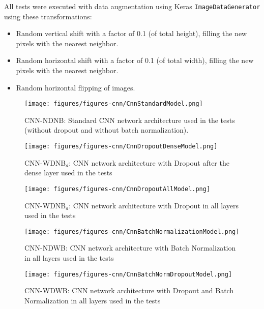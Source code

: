\documentclass[../dropout-vs-batch-normalization.tex]{subfiles}
\begin{document}
All tests were executed with data augmentation using Keras \verb|ImageDataGenerator| using these transformations:

\begin{itemize}
\item Random vertical shift with a factor of 0.1 (of total height), filling the new pixels with the nearest neighbor.
\item Random horizontal shift with a factor of 0.1 (of total width), filling the new pixels with the nearest neighbor.
\item Random horizontal flipping of images.

\end{itemize}

\begin{figure*}
\centerline{\texttt{[image: figures/figures-cnn/CnnStandardModel.png]}}
\caption{CNN-NDNB: Standard CNN network architecture used in the tests (without dropout and without batch normalization).}
\label{fig:CnnStandardModel}
\end{figure*}

\begin{figure*}
\centerline{\texttt{[image: figures/figures-cnn/CnnDropoutDenseModel.png]}}
\caption{CNN-WDNB$_d$: CNN network architecture with Dropout after the dense layer used in the tests}
\label{fig:CnnDropoutDenseModel}
\end{figure*}

\begin{figure*}
\centerline{\texttt{[image: figures/figures-cnn/CnnDropoutAllModel.png]}}
\caption{CNN-WDNB$_a$: CNN network architecture with Dropout in all layers used in the tests}
\label{fig:CnnDropoutAllModel}
\end{figure*}

\begin{figure*}
\centerline{\texttt{[image: figures/figures-cnn/CnnBatchNormalizationModel.png]}}
\caption{CNN-NDWB: CNN network architecture with Batch Normalization in all layers used in the tests}
\label{fig:CnnBatchNormalizationModel}
\end{figure*}

\begin{figure*}
\centerline{\texttt{[image: figures/figures-cnn/CnnBatchNormDropoutModel.png]}}
\caption{CNN-WDWB: CNN network architecture with Dropout and Batch Normalization in all layers used in the tests}
\label{fig:CnnBatchNormDropoutModel}
\end{figure*}
\end{document}
